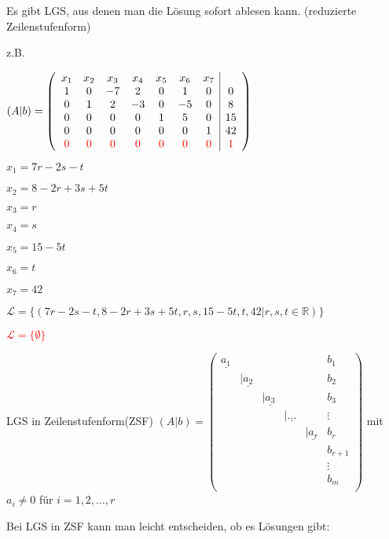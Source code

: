 \documentclass{../tudscript}
\begin{document}
Es gibt LGS, aus denen man die Lösung sofort ablesen kann. (reduzierte
Zeilenstufenform)

z.B.

\((A|b) = \left(\begin{array}{ccccccc|c}  x_1 & x_2 & x_3 & x_4 & x_5 & x_6 & x_7 \\  1 & 0 & -7 & 2 & 0 & 1 & 0 & 0 \\  0 & 1 & 2 & -3 & 0 & -5 & 0 & 8 \\  0 & 0 & 0 & 0 & 1 & 5 & 0 & 15 \\  0 & 0 & 0 & 0 & 0 & 0 & 1 & 42 \\  \textcolor{red}{0} & \textcolor{red}{0} & \textcolor{red}{0} & \textcolor{red}{0} & \textcolor{red}{0} & \textcolor{red}{0} & \textcolor{red}{0} & \textcolor{red}{1} \\ \end{array}\right)\)

\(x_1 = 7r -2s -t\)

\(x_2 = 8-2r+3s+5t\)

\(x_3 = r\)

\(x_4 = s\)

\(x_5 = 15-5t\)

\(x_6 = t\)

\(x_7 = 42\)

\(\mathcal{L} =\{(7r-2s-t, 8-2r+3s+5t, r, s, 15-5t,t,42 | r,s,t \in \mathbb{R} )\}\)

\textcolor{red}{${\mathcal{L} = \{\emptyset\}}$}

\hypertarget{allgemein}{%
\label{allgemein}}

LGS in Zeilenstufenform(ZSF)
\({(A|b) = \left(\begin{array}{ccccc|c}  \underline{a_1} & & & & & b_1 \\  &|\underline{a_2}& & & & b_2 \\  & & |\underline{a_3} & & & b_3 \\  & & & |\underline{\dots} & & \vdots \\  & & & & |\underline{a_r}& b_r \\  & & & & & b_{r+1} \\  & & & & & \vdots \\  & & & & & b_m \\ \end{array}\right)}\)
mit \({ a_i \neq 0}\) für \({i= 1,2,\dots,r }\)

\hypertarget{bemerkung}{%
\label{bemerkung}}

Bei LGS in ZSF kann man leicht entscheiden, ob es Lösungen gibt:
\end{document}
